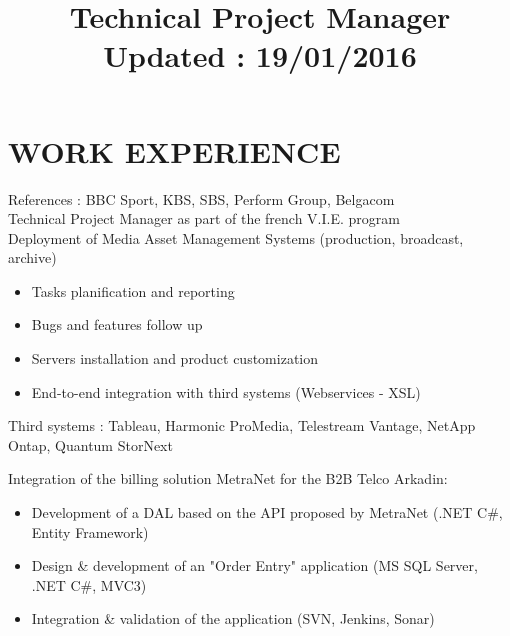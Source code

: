 \documentclass[11pt,a4paper]{moderncv}
\title{Technical Project Manager %
 \newline \newline \small{Updated : 19/01/2016} }                          %
\begin{document}
\maketitle




  
  
\section{WORK EXPERIENCE}

{}{References : BBC Sport, KBS, SBS, Perform Group, Belgacom \\Technical Project Manager as part of the french V.I.E. program \\ Deployment of Media Asset Management Systems (production, broadcast, archive) 
\begin{itemize}
\item Tasks planification and reporting
\item Bugs and features follow up
\item Servers installation and product customization
\item End-to-end integration with third systems (Webservices - XSL) 
\end{itemize}
Third systems :  Tableau, Harmonic ProMedia, Telestream Vantage, NetApp Ontap, Quantum StorNext}{}{}

{}{Integration of the billing solution MetraNet for the B2B Telco Arkadin: 
\begin{itemize}
\item Development of a DAL based on the API proposed by MetraNet (.NET C\#, Entity Framework)
\item Design \& development of an "Order Entry" application (MS SQL Server,  .NET C\#, MVC3)
\item Integration \& validation of the application (SVN, Jenkins, Sonar)
\end{itemize} }{}{}
\end{document}
